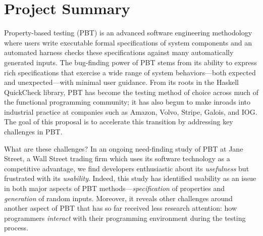 \section*{Project Summary}


\newcommand{\summarysection}[1]{\medskip \noindent {\bf #1.}}


\summarysection{Overview}
Property-based testing (PBT) is an advanced software engineering
methodology where users write executable formal specifications of system
components
and an automated harness checks these specifications against
many automatically generated inputs.  The bug-finding power of PBT
stems from its ability to express rich specifications that
exercise a wide range of system behaviors---both
expected and unexpected---with minimal user guidance.
%
From its roots in the Haskell QuickCheck library, PBT has become
the testing method of choice across much of the functional programming
community; it has also begun to make inroads into industrial practice
at companies such as Amazon, Volvo, Stripe, Galois, and IOG.
%
The goal of this proposal is to accelerate this transition
by addressing key challenges in
PBT.

What are these challenges? 
In an ongoing need-finding study of PBT at Jane
Street, a Wall Street trading firm which uses its software
technology as a competitive advantage, we find developers enthusiastic
about its {\em usefulness} but frustrated with its {\em usability}.
%
Indeed, this study has identified usability as an issue in both major aspects
of PBT methods---{\em specification} of properties and {\em
  generation} of random inputs. Moreover, it reveals other challenges
around another aspect of PBT that has so far received less research
attention: how programmers {\em interact} with their programming
environment during the testing process.


